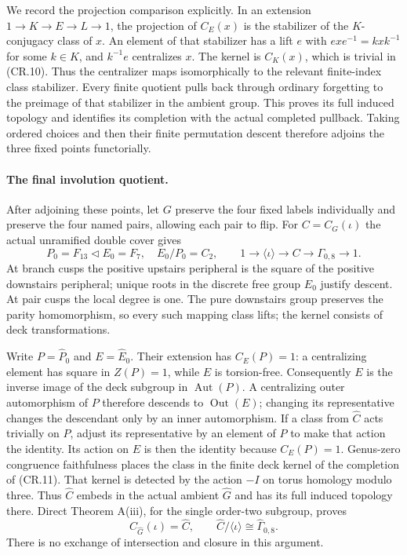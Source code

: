 We record the projection comparison explicitly.  In an extension
$1\to K\to E\to L\to1$, the projection of $C_E(x)$ is the stabilizer
of the $K$-conjugacy class of $x$.  An element of that stabilizer has
a lift $e$ with $exe^{-1}=kxk^{-1}$ for some $k\in K$, and
$k^{-1}e$ centralizes $x$.  The kernel is $C_K(x)$, which is trivial
in (CR.10).  Thus the centralizer maps isomorphically to the relevant
finite-index class stabilizer.  Every finite quotient pulls back
through ordinary forgetting to the preimage of that stabilizer in
the ambient group.  This proves its full induced topology and
identifies its completion with the actual completed pullback.
Taking ordered choices and then their finite permutation descent
therefore adjoins the three fixed points functorially.

\paragraph{The final involution quotient.}
After adjoining these points, let $G$ preserve the four fixed labels
individually and preserve the four named pairs, allowing each pair to
flip.  For $C=C_G(\iota)$ the actual unramified double cover gives
\[
 P_0=F_{13}\mathrel{\triangleleft}E_0=F_7,\quad E_0/P_0=C_2,
 \qquad
 1\longrightarrow\langle\iota\rangle\longrightarrow C
       \longrightarrow\Gamma_{0,8}\longrightarrow1.            \tag{CR.11}
\]
At branch cusps the positive upstairs peripheral is the square of
the positive downstairs peripheral; unique roots in the discrete
free group $E_0$ justify descent.  At pair cusps the local degree is
one.  The pure downstairs group preserves the parity homomorphism,
so every such mapping class lifts; the kernel consists of deck
transformations.

Write $P=\widehat P_0$ and $E=\widehat E_0$.  Their extension has
$C_E(P)=1$: a centralizing element has square in $Z(P)=1$, while
$E$ is torsion-free.  Consequently $E$ is the inverse image of the
deck subgroup in $\operatorname{Aut}(P)$.  A centralizing outer
automorphism of $P$ therefore descends to $\operatorname{Out}(E)$;
changing its representative changes the descendant only by an inner
automorphism.  If a class from $\widehat C$ acts trivially on $P$,
adjust its representative by an element of $P$ to make that action
the identity.  Its action on $E$ is then the identity because
$C_E(P)=1$.  Genus-zero congruence faithfulness places the class in
the finite deck kernel of the completion of (CR.11).  That kernel
is detected by the action $-I$ on torus homology modulo three.
Thus $\widehat C$ embeds in the actual ambient $\widehat G$ and has
its full induced topology there.  Direct Theorem A(iii), for the
single order-two subgroup, proves
\[
 C_{\widehat G}(\iota)=\widehat C,\qquad
 \widehat C/\langle\iota\rangle\cong\widehat\Gamma_{0,8}.        \tag{CR.12}
\]
There is no exchange of intersection and closure in this argument.

